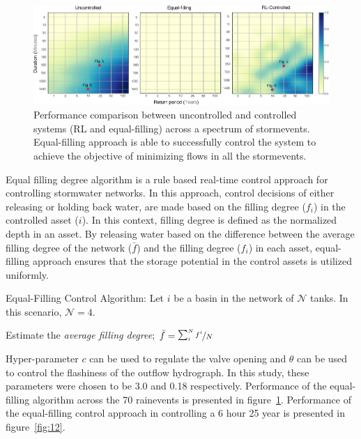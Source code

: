\begin{figure}[H]
	\includegraphics[width=\linewidth]{RL-SI-figures/heatmap_eq.eps}
	\caption{Performance comparison between uncontrolled and controlled systems (RL and equal-filling) across a spectrum of stormevents. Equal-filling approach is able to successfully control the system to achieve the objective of minimizing flows in all the stormevents.}\label{fig:11}
\end{figure}


Equal filling degree algorithm is a rule based real-time control approach for controlling stormwater networks.
In this approach, control decisions of either releasing or holding back water, are made based on the filling degree (${f}_i$) in the controlled asset ($i$).
In this context, filling degree is defined as the normalized depth in an asset.
By releasing water based on the difference between the average filling degree of the network ($\bar{f}$) and the filling degree (${f}_i$) in each asset, equal-filling approach ensures that the storage potential in the control assets is utilized uniformly.  

\begin{algorithm}
	\caption{Equal-Filling Control Algorithm: Let $i$ be a basin in the network of $\mathcal{N}$ tanks. In this scenario, $\mathcal{N} = 4$.}\label{efd}
Estimate the \textit{average filling degree}; $\bar{f} = \nicefrac{\sum^N_i f^i}{N}$\\
\end{algorithm}

Hyper-parameter $c$ can be used to regulate the valve opening and $\theta$ can be used to control the flashiness of the outflow hydrograph.
In this study, these parameters were chosen to be 3.0 and 0.18 respectively.
Performance of the equal-filling algorithm across the 70 rainevents is presented in figure~\ref{fig:11}.
Performance of the equal-filling control approach in controlling a 6 hour 25 year is presented in figure~\ref{fig:12}.

